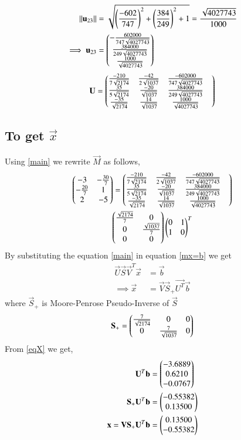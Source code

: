 \documentclass[journal,12pt,twocolumn]{IEEEtran}
\begin{document}
\begin{align}
	\left\lVert\mathbf{u}_{23}\right\rVert &=\sqrt{\left(\frac{-602}{747}\right)^2+\left(\frac{384}{249}\right)^2+1}= \frac{\sqrt{4027743}}{1000}\\
	\implies \mathbf{u}_{23} &=\begin{pmatrix}-\frac{602000}{747\sqrt{4027743}} \\ \frac{384000}{249\sqrt{4027743}}\\
		                      \frac{1000}{\sqrt{4027743}}\end{pmatrix}
\end{align}
\begin{align}
	\mathbf{U}=\begin{pmatrix}\frac{-210}{7\sqrt{2174}} & \frac{-42}{2\sqrt{1037}} & \frac{-602000}{747\sqrt{4027743}} &\\ \frac{35}{5\sqrt{2174}}& \frac{-20}{\sqrt{1037}}&  \frac{384000}{249\sqrt{4027743}} \\
		\frac{-35}{\sqrt{2174}}& \frac{14}{\sqrt{1037}} &   \frac{1000}{\sqrt{4027743}}\end{pmatrix}
\end{align}
\subsection{To get $\vec{x}$ }
Using \eqref{main} we rewrite $\vec{M}$ as follows,
\begin{multline}
		\begin{pmatrix}-3&-\frac{30}{7} \\-\frac{20}{7} & 1 \\ 2 & -5\end{pmatrix} =
		\begin{pmatrix}\frac{-210}{7\sqrt{2174}} & \frac{-42}{2\sqrt{1037}} & \frac{-602000}{747\sqrt{4027743}} &\\ \frac{35}{5\sqrt{2174}}& \frac{-20}{\sqrt{1037}}&  \frac{384000}{249\sqrt{4027743}} \\
			\frac{-35}{\sqrt{2174}}& \frac{14}{\sqrt{1037}} &   \frac{1000}{\sqrt{4027743}}\end{pmatrix} \\
    	\begin{pmatrix}\frac{\sqrt{2174}}{7} & 0\\ 0 & \frac{\sqrt{1037}}{7} \\ 0 &0\end{pmatrix}
		\begin{pmatrix}0 & 1\\1 & 0\end{pmatrix}^T
\end{multline}
By substituting the equation \eqref{main} in equation \eqref{mx=b} we get 
\begin{align}
	\vec{U}\vec{S}\vec{V}^T\vec{x} & = \vec{b}\\
	\implies\vec{x} &= \vec{V}\vec{S}_+\vec{U^T}\vec{b} \label{eqX}
\end{align}
where $\vec{S}_+$ is Moore-Penrose Pseudo-Inverse of $\vec{S}$
\begin{align}
	\mathbf{S}_+=\begin{pmatrix}\frac{7}{\sqrt{2174}} & 0 & 0 \\ 0 & \frac{7}{\sqrt{1037}} & 0\end{pmatrix}
\end{align}
From \eqref{eqX} we get,
\begin{align}
	\mathbf{U}^T\mathbf{b}&=\begin{pmatrix}-3.6889 \\ 0.6210 \\ -0.0767\end{pmatrix}\\ 
	\mathbf{S}_+\mathbf{U}^T\mathbf{b}&=\begin{pmatrix}-0.55382 \\ 0.13500\end{pmatrix}\\
	\mathbf{x} = \mathbf{V}\mathbf{S}_+\mathbf{U}^T\mathbf{b} &= \begin{pmatrix}0.13500 \\ -0.55382\end{pmatrix}\label{eqXSol1}
\end{align}
\end{document}
